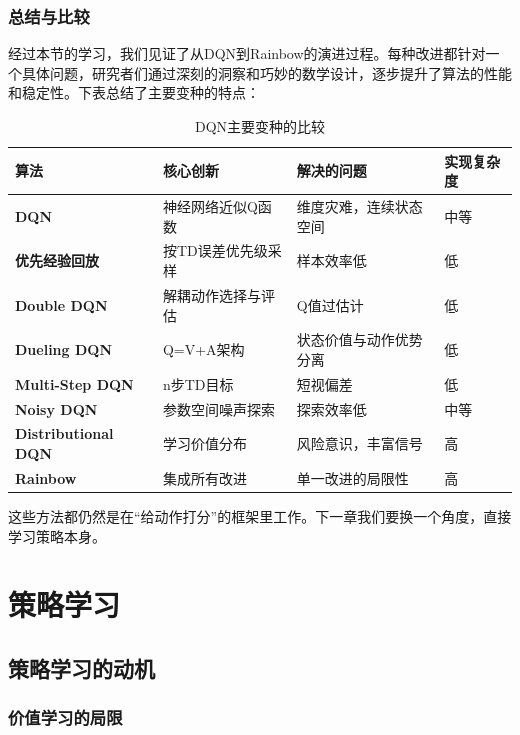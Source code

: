 \documentclass[lang=cn,zihao=-4,a4paper,fontset=windows]{beautybook}
\begin{document}
\subsection{总结与比较}

经过本节的学习，我们见证了从DQN到Rainbow的演进过程。每种改进都针对一个具体问题，研究者们通过深刻的洞察和巧妙的数学设计，逐步提升了算法的性能和稳定性。下表总结了主要变种的特点：

\begin{table}[h]
\centering
\caption{DQN主要变种的比较}
\begin{tabular}{p{}p{}p{}p{}}
\toprule
\textbf{算法} & \textbf{核心创新} & \textbf{解决的问题} & \textbf{实现复杂度} \\
\midrule
\textbf{DQN} & 神经网络近似Q函数 & 维度灾难，连续状态空间 & 中等 \\
\textbf{优先经验回放} & 按TD误差优先级采样 & 样本效率低 & 低 \\
\textbf{Double DQN} & 解耦动作选择与评估 & Q值过估计 & 低 \\
\textbf{Dueling DQN} & Q=V+A架构 & 状态价值与动作优势分离 & 低 \\
\textbf{Multi-Step DQN} & n步TD目标 & 短视偏差 & 低 \\
\textbf{Noisy DQN} & 参数空间噪声探索 & 探索效率低 & 中等 \\
\textbf{Distributional DQN} & 学习价值分布 & 风险意识，丰富信号 & 高 \\
\textbf{Rainbow} & 集成所有改进 & 单一改进的局限性 & 高 \\
\bottomrule
\end{tabular}
\end{table}

\noindent 这些方法都仍然是在“给动作打分”的框架里工作。下一章我们要换一个角度，直接学习策略本身。

\chapter{策略学习}

\section{策略学习的动机}

\subsection{价值学习的局限}
\end{document}
